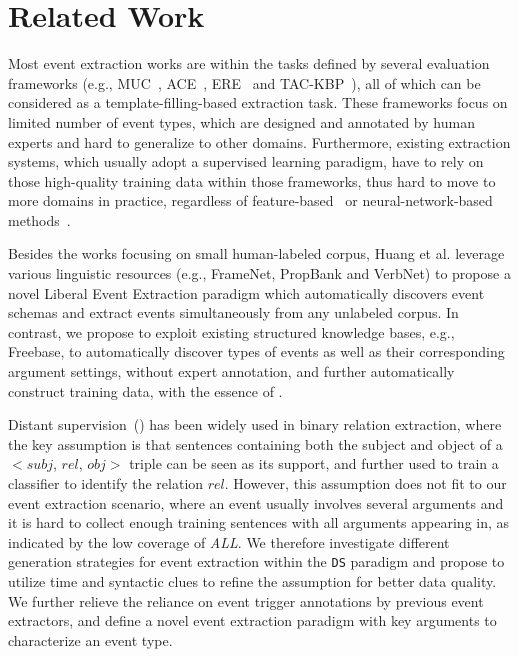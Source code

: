 \section{Related Work}
Most event extraction works are within the tasks defined by several evaluation frameworks (e.g., MUC~\cite{grishman1996message}, 
ACE~\cite{doddington2004automatic}, ERE~\cite{song2015light} and TAC-KBP~\cite{mitamura2015event}), 
all of which can be considered as a template-filling-based extraction task.
These frameworks focus on limited number of event types, which are designed and annotated by human experts and
hard to generalize to other domains.  
Furthermore, existing extraction systems, which usually adopt a supervised learning paradigm, 
have to rely on those high-quality training data within those frameworks, 
thus hard to move to more domains in practice, regardless of feature-based~\cite{gupta2009predicting,hong2011using,li2013joint} or neural-network-based methods~\cite{chen2015event,nguyen2016joint}.

Besides the works focusing on small human-labeled corpus, 
Huang et al.  leverage various linguistic resources (e.g., FrameNet, PropBank and VerbNet) to propose a novel Liberal Event Extraction paradigm 
which automatically discovers event schemas and extract events simultaneously from any unlabeled corpus. 
In contrast, we propose to exploit existing structured knowledge bases, e.g., Freebase, to automatically discover 
types of events as well as their corresponding argument settings, without expert annotation, and further automatically
construct training data, with the essence of \DS.
 
Distant supervision~(\DS) has been widely used in binary relation extraction, where the key assumption is that 
 sentences containing both the subject and object of a $<$$subj$, $rel$, $obj$$>$ triple can be seen as its support, and further
used to train a classifier to identify the relation $rel$. However,  this assumption does not fit to our event extraction scenario, 
where an event usually involves several arguments and it is hard to collect enough training sentences with all arguments appearing in, as indicated by the low coverage of \textit{ALL}. We therefore investigate different generation strategies for event extraction within the \texttt{DS} paradigm and propose to utilize time and syntactic clues to refine the \DS assumption for better data quality. We further relieve the reliance on event trigger annotations by previous event extractors, and define a novel event extraction paradigm with key arguments to characterize an event type. 


